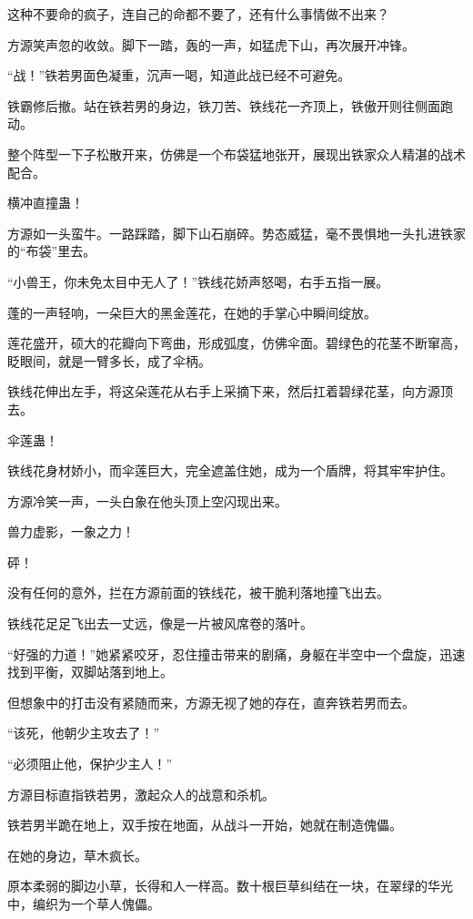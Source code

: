 \begin{this_body}
这种不要命的疯子，连自己的命都不要了，还有什么事情做不出来？

方源笑声忽的收敛。脚下一踏，轰的一声，如猛虎下山，再次展开冲锋。

“战！”铁若男面色凝重，沉声一喝，知道此战已经不可避免。

铁霸修后撤。站在铁若男的身边，铁刀苦、铁线花一齐顶上，铁傲开则往侧面跑动。

整个阵型一下子松散开来，仿佛是一个布袋猛地张开，展现出铁家众人精湛的战术配合。

横冲直撞蛊！

方源如一头蛮牛。一路踩踏，脚下山石崩碎。势态威猛，毫不畏惧地一头扎进铁家的“布袋”里去。

“小兽王，你未免太目中无人了！”铁线花娇声怒喝，右手五指一展。

蓬的一声轻响，一朵巨大的黑金莲花，在她的手掌心中瞬间绽放。

莲花盛开，硕大的花瓣向下弯曲，形成弧度，仿佛伞面。碧绿色的花茎不断窜高，眨眼间，就是一臂多长，成了伞柄。

铁线花伸出左手，将这朵莲花从右手上采摘下来，然后扛着碧绿花茎，向方源顶去。

伞莲蛊！

铁线花身材娇小，而伞莲巨大，完全遮盖住她，成为一个盾牌，将其牢牢护住。

方源冷笑一声，一头白象在他头顶上空闪现出来。

兽力虚影，一象之力！

砰！

没有任何的意外，拦在方源前面的铁线花，被干脆利落地撞飞出去。

铁线花足足飞出去一丈远，像是一片被风席卷的落叶。

“好强的力道！”她紧紧咬牙，忍住撞击带来的剧痛，身躯在半空中一个盘旋，迅速找到平衡，双脚站落到地上。

但想象中的打击没有紧随而来，方源无视了她的存在，直奔铁若男而去。

“该死，他朝少主攻去了！”

“必须阻止他，保护少主人！”

方源目标直指铁若男，激起众人的战意和杀机。

铁若男半跪在地上，双手按在地面，从战斗一开始，她就在制造傀儡。

在她的身边，草木疯长。

原本柔弱的脚边小草，长得和人一样高。数十根巨草纠结在一块，在翠绿的华光中，编织为一个草人傀儡。


\end{this_body}
